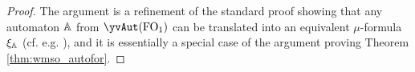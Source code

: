 \begin{proof}
The argument  is a refinement of the standard proof showing that any automaton 
$\mathbb{A}$ from $\yvAut(\ofo)$ can be translated into an equivalent $\mu$-formula 
$\xi_\mathbb{A}$ (cf. e.g. \cite{Ven08}), and it is essentially a special case of the argument proving Theorem \ref{thm:wmso_autofor}.



%
%
%



\end{proof}
